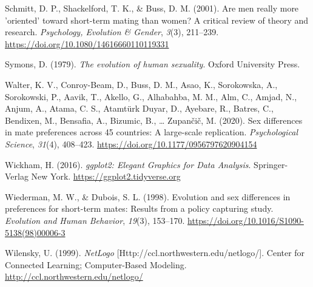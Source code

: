 \documentclass[
  11pt,
]{article}
\newlength{\cslhangindent}
\newlength{\cslentryspacingunit} %
\newenvironment{CSLReferences}[2] %
 {%
  \setlength{\parindent}{0pt}
  \ifodd #1
  \let\oldpar\par
  \def\par{\hangindent=\cslhangindent\oldpar}
  \fi
  \setlength{\parskip}{#2\cslentryspacingunit}
 }%
 {}
\begin{document}
\begin{CSLReferences}{1}{0}
\leavevmode{}%
Schmitt, D. P., Shackelford, T. K., \& Buss, D. M. (2001). Are men
really more 'oriented' toward short-term mating than women? A critical
review of theory and research. \emph{Psychology, Evolution \& Gender},
\emph{3}(3), 211--239. \url{https://doi.org/10.1080/14616660110119331}

\leavevmode{}%
Symons, D. (1979). \emph{The evolution of human sexuality}. Oxford
University Press.

\leavevmode{}%
Walter, K. V., Conroy-Beam, D., Buss, D. M., Asao, K., Sorokowska, A.,
Sorokowski, P., Aavik, T., Akello, G., Alhabahba, M. M., Alm, C., Amjad,
N., Anjum, A., Atama, C. S., Atamtürk Duyar, D., Ayebare, R., Batres,
C., Bendixen, M., Bensafia, A., Bizumic, B., \ldots{} Zupančič, M.
(2020). Sex differences in mate preferences across 45 countries: A
large-scale replication. \emph{Psychological Science}, \emph{31}(4),
408--423. \url{https://doi.org/10.1177/0956797620904154}

\leavevmode{}%
Wickham, H. (2016). \emph{{ggplot2: Elegant Graphics for Data
Analysis}}. Springer-Verlag New York.
\url{https://ggplot2.tidyverse.org}

\leavevmode{}%
Wiederman, M. W., \& Dubois, S. L. (1998). Evolution and sex differences
in preferences for short-term mates: Results from a policy capturing
study. \emph{Evolution and Human Behavior}, \emph{19}(3), 153--170.
\url{https://doi.org/10.1016/S1090-5138(98)00006-3}

\leavevmode{}%
Wilensky, U. (1999). \emph{NetLogo}
{[}Http://ccl.northwestern.edu/netlogo/{]}. Center for Connected
Learning; Computer-Based Modeling.
\url{http://ccl.northwestern.edu/netlogo/}

\end{CSLReferences}
\end{document}
